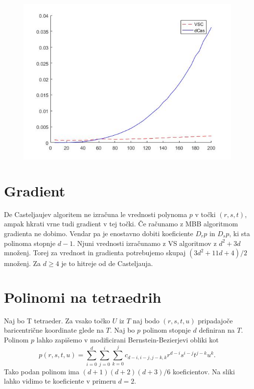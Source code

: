 \documentclass{article}
\begin{document}
 \begin{figure}[h]
\centering
\begin{minipage}{.5\textwidth}
\centering
 \includegraphics[scale=0.3]{vsc}
\label{fig:vsc}
\end{minipage}
\end{figure}


 \newpage
\section{Gradient}
De Casteljaujev algoritem ne izračuna le vrednosti polynoma $p$ v točki $(r,s,t)$, ampak hkrati vrne tudi gradient v tej točki. Če računamo z MBB algoritmom gradienta ne dobimo. Vendar pa je enostavno dobiti koeficiente $D_rp$ in $D_sp$, ki sta polinoma stopnje $d-1$. Njuni vrednosti izračunamo z VS algoritmov z $d^2 + 3d$ množenj. Torej za vrednost in gradienta potrebujemo skupaj $(3d^2 + 11d + 4)/2$ množenj. Za $d\geq4$ je to hitreje od de Casteljauja. 


\section{Polinomi na tetraedrih}

Naj bo T tetraeder. Za vsako točko $U$ iz $T$ naj bodo $(r,s,t,u)$ pripadajoče baricentrične koordinate glede na $T$.  Naj bo $p$ polinom stopnje $d$ definiran na $T$. Polinom $p$ lahko zapišemo v modificirani Bernstein-Bezierjevi obliki kot 
$$p(r,s,t,u) = \sum_{i = 0}^d{\sum_{j=0}^{i}{\sum_{k = 0}^{j}{c_{d-i,i-j,j-k,k} r^{d-i} s^{i-j} t^{j-k} u^k}}}.$$
Tako podan polinom ima $(d+1)(d+2)(d+3)/6$ koeficientov. Na sliki lahko vidimo te koeficiente v primeru $d=2$.
\end{document}
